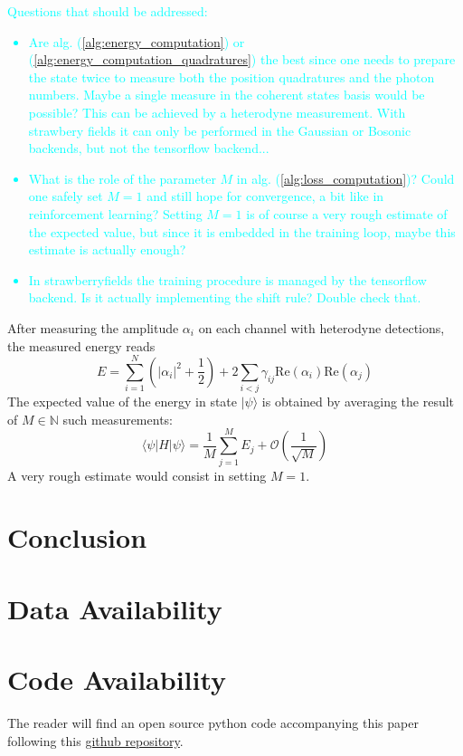 \documentclass[reprint, amsmath, amssymb, aps]{revtex4-2}
\begin{document}
    \textcolor{cyan}{
        Questions that should be addressed:
        \begin{itemize}
            \item Are alg. (\ref{alg:energy_computation}) or (\ref{alg:energy_computation_quadratures}) the best since one needs to prepare the state twice to measure both the position quadratures and the photon numbers. Maybe a single measure in the coherent states basis would be possible? This can be achieved by a heterodyne measurement. With strawbery fields it can only be performed in the Gaussian or Bosonic backends, but not the tensorflow backend...
            \item What is the role of the parameter $M$ in alg. (\ref{alg:loss_computation})? Could one safely set $M=1$ and still hope for convergence, a bit like in reinforcement learning? Setting $M=1$ is of course a very rough estimate of the expected value, but since it is embedded in the training loop, maybe this estimate is actually enough?
            \item In strawberryfields the training procedure is managed by the tensorflow backend. Is it actually implementing the shift rule? Double check that.
        \end{itemize}
    }

    After measuring the amplitude $\alpha_i$ on each channel with heterodyne detections, the measured energy reads
    \begin{equation}
        E = \sum_{i=1}^N\left(|\alpha_i|^2+\frac{1}{2}\right) + 2\sum_{i<j}\gamma_{ij}\text{Re}(\alpha_i)\text{Re}(\alpha_j)
    \end{equation}
    The expected value of the energy in state $|\psi\rangle$ is obtained by averaging the result of $M\in\mathbb N$ such measurements:
    \begin{equation}
        \langle\psi|H|\psi\rangle = \frac{1}{M}\sum_{j=1}^M E_j + \mathcal O\left(\frac{1}{\sqrt M}\right)
    \end{equation}
    A very rough estimate would consist in setting $M=1$.


\section{Conclusion}

\begin{acknowledgments}

\end{acknowledgments}

\section*{Data Availability}

\section*{Code Availability}

The reader will find an open source python code accompanying this paper following this \href{https://github.com/MatthieuSarkis/qdo}{github repository}.

\appendix

\nocite{*}


\end{document}
